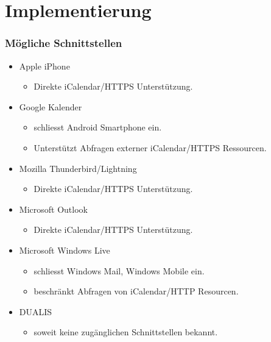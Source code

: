 \documentclass{beamer}
\begin{document}
\section{Implementierung}
\begin{frame}\frametitle{Mögliche Schnittstellen}
  \begin{itemize}
  \item Apple iPhone
    \begin{itemize}
    \item Direkte iCalendar/HTTPS Unterstützung.
    \end{itemize}
  \item Google Kalender
    \begin{itemize}
    \item schliesst Android Smartphone ein.
    \item Unterstützt Abfragen externer iCalendar/HTTPS Ressourcen.
    \end{itemize}
  \item Mozilla Thunderbird/Lightning
    \begin{itemize}
    \item Direkte iCalendar/HTTPS Unterstützung.
    \end{itemize}
  \item Microsoft Outlook
    \begin{itemize}
    \item Direkte iCalendar/HTTPS Unterstützung.
    \end{itemize}
  \item Microsoft Windows Live
    \begin{itemize}
    \item schliesst Windows Mail, Windows Mobile ein.
    \item beschränkt Abfragen von iCalendar/HTTP Resourcen.
    \end{itemize}
    \pause
  \item \textsc{DUALIS}
    \begin{itemize}
    \item soweit keine zugänglichen Schnittstellen bekannt.
    \end{itemize}
  \end{itemize}
\end{frame}
\end{document}
